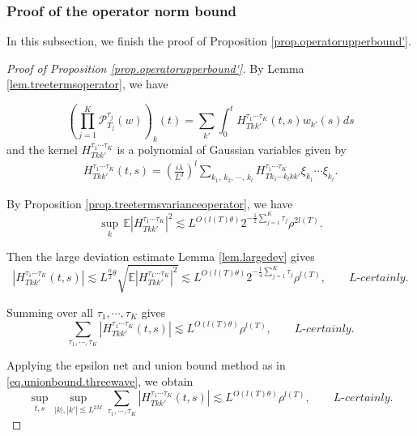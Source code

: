 \subsubsection{Proof of the operator norm bound} In this subsection, we finish the proof of Proposition \ref{prop.operatorupperbound'}.

\begin{proof}[Proof of Proposition \ref{prop.operatorupperbound'}]
By Lemma \ref{lem.treetermsoperator}, we have 

\begin{equation}
    \left(\prod_{j=1}^K\mathcal{P}^{\tau_j}_{T_j}(w)\right)_{k}(t)=\sum_{k'}\int_0^t H^{\tau_1\cdots \tau_{K}}_{Tkk'}(t,s) w_{k'}(s) ds
\end{equation}
and the kernel $H^{\tau_1\cdots \tau_{K}}_{Tkk'}$ is a polynomial of Gaussian variables given by
\begin{equation}
\begin{split}
H^{\tau_1\cdots \tau_{K}}_{Tkk'}(t,s)=\left(\frac{i\lambda}{L^{d}}\right)^l\sum_{k_1,\, k_2,\, \cdots,\, k_{l}} H^{\tau_1\cdots \tau_{K}}_{Tk_1\cdots k_{l}kk'} \xi_{k_1}\cdots \xi_{k_{l}}.
\end{split}
\end{equation}

By Proposition \ref{prop.treetermsvarianceoperator}, we have
\begin{equation}
    \sup_k\, \mathbb{E}|H^{\tau_1\cdots \tau_{K}}_{Tkk'}|^2\lesssim L^{O(l(T)\theta)}2^{-\frac{1}{2}\sum_{j=1}^K \tau_{j}} \rho^{2l(T)}.
\end{equation}

Then the large deviation estimate Lemma \ref{lem.largedev} gives 
\begin{equation}
|H^{\tau_1\cdots \tau_{K}}_{Tkk'}(t,s)|\lesssim L^{\frac{n}{2}\theta} \sqrt{\mathbb{E}|H^{\tau_1\cdots \tau_{K}}_{Tkk'}|^2}\lesssim L^{O(l(T)\theta)} 2^{-\frac{1}{4}\sum_{j=1}^K \tau_{j}} \rho^{l(T)},\qquad \textit{L-certainly}.
\end{equation} 

Summing over all $\tau_1,\cdots, \tau_{K}$ gives
\begin{equation}
\sum_{\tau_1,\cdots, \tau_{K}}|H^{\tau_1\cdots \tau_{K}}_{Tkk'}(t,s)|\lesssim L^{O(l(T)\theta)} \rho^{l(T)},\qquad \textit{L-certainly}.
\end{equation} 

Applying the epsilon net and union bound method as in \eqref{eq.unionbound.threewave}, we obtain
\begin{equation}
    \sup_{t,s}\sup_{|k|,|k'|\lesssim L^{2M}}\sum_{\tau_1,\cdots, \tau_{K}}|H^{\tau_1\cdots \tau_{K}}_{Tkk'}(t,s)|\lesssim L^{O(l(T)\theta)}  \rho^{l(T)},\qquad \textit{L-certainly}.
\end{equation}


\end{proof}
